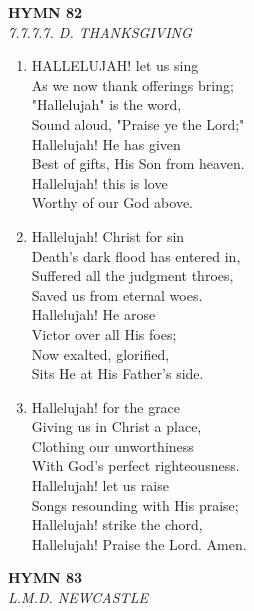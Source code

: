 \documentclass[11pt,a4paper]{article}
\begin{document}
\newpage
\begin{center}
    {\Large \textbf{HYMN 82}}
    \\
    \textit{7.7.7.7. D. THANKSGIVING}
\end{center}
\vspace{1em}

\begin{enumerate}
    \item HALLELUJAH! let us sing \\
        As we now thank offerings bring; \\
        "Hallelujah" is the word, \\
        Sound aloud, "Praise ye the Lord;" \\
        Hallelujah! He has given \\
        Best of gifts, His Son from heaven. \\
        Hallelujah! this is love \\
        Worthy of our God above.

    \item Hallelujah! Christ for sin \\
        Death's dark flood has entered in, \\
        Suffered all the judgment throes, \\
        Saved us from eternal woes. \\
        Hallelujah! He arose \\
        Victor over all His foes; \\
        Now exalted, glorified, \\
        Sits He at His Father's side.

    \item Hallelujah! for the grace \\
        Giving us in Christ a place, \\
        Clothing our unworthiness \\
        With God's perfect righteousness. \\
        Hallelujah! let us raise \\
        Songs resounding with His praise; \\
        Hallelujah! strike the chord, \\
        Hallelujah! Praise the Lord. Amen.

\end{enumerate}

\newpage
\begin{center}
    {\Large \textbf{HYMN 83}}
    \\
    \textit{L.M.D. NEWCASTLE}
\end{center}
\vspace{1em}
\end{document}
